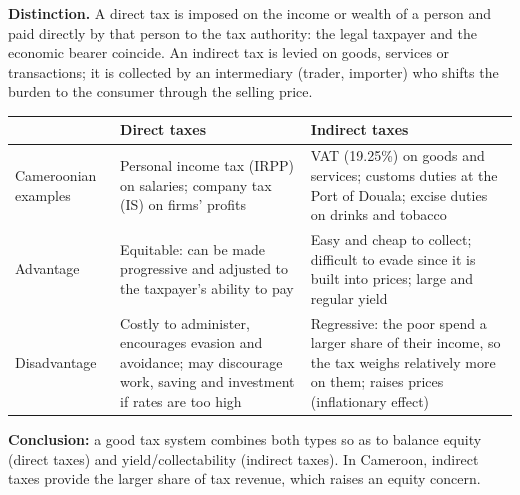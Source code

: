 \documentclass[11pt]{article}
\newcommand{\cle}[1]{{\popxbold\color{popdark}#1}}
\begin{document}
\begin{corrige}
\textbf{Distinction.} A \cle{direct tax} is imposed on the income or wealth of a person and paid directly by that person to the tax authority: the legal taxpayer and the economic bearer coincide. An \cle{indirect tax} is levied on goods, services or transactions; it is collected by an intermediary (trader, importer) who shifts the burden to the consumer through the selling price.

\begin{center}
\begin{tabularx}{\linewidth}{|l|X|X|}
\hline
\rowcolor{popblueL} & \textbf{Direct taxes} & \textbf{Indirect taxes} \\ \hline
Cameroonian examples & Personal income tax (IRPP) on salaries; company tax (IS) on firms' profits & VAT (19.25\%) on goods and services; customs duties at the Port of Douala; excise duties on drinks and tobacco \\ \hline
Advantage & Equitable: can be made progressive and adjusted to the taxpayer's ability to pay & Easy and cheap to collect; difficult to evade since it is built into prices; large and regular yield \\ \hline
Disadvantage & Costly to administer, encourages evasion and avoidance; may discourage work, saving and investment if rates are too high & Regressive: the poor spend a larger share of their income, so the tax weighs relatively more on them; raises prices (inflationary effect) \\ \hline
\end{tabularx}
\end{center}

\textbf{Conclusion:} a good tax system combines both types so as to balance equity (direct taxes) and yield/collectability (indirect taxes). In Cameroon, indirect taxes provide the larger share of tax revenue, which raises an equity concern.
\end{corrige}
\end{document}
